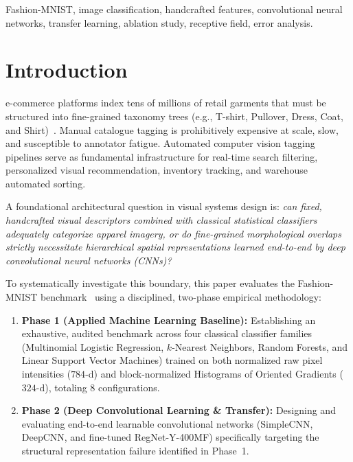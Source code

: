 \documentclass[conference]{IEEEtran}
\begin{document}
\begin{IEEEkeywords}
Fashion-MNIST, image classification, handcrafted features, convolutional neural networks, transfer learning, ablation study, receptive field, error analysis.
\end{IEEEkeywords}

\section{Introduction}\label{sec:intro}

 e-commerce platforms index tens of millions of retail garments that must be structured into fine-grained taxonomy trees (e.g., T-shirt, Pullover, Dress, Coat, and Shirt)~\cite{liu2016deepfashion}. Manual catalogue tagging is prohibitively expensive at scale, slow, and susceptible to annotator fatigue. Automated computer vision tagging pipelines serve as fundamental infrastructure for real-time search filtering, personalized visual recommendation, inventory tracking, and warehouse automated sorting.

A foundational architectural question in visual systems design is: \emph{can fixed, handcrafted visual descriptors combined with classical statistical classifiers adequately categorize apparel imagery, or do fine-grained morphological overlaps strictly necessitate hierarchical spatial representations learned end-to-end by deep convolutional neural networks (CNNs)?}

To systematically investigate this boundary, this paper evaluates the Fashion-MNIST benchmark~\cite{xiao2017fashionmnist} using a disciplined, two-phase empirical methodology:
\begin{enumerate}
    \item \textbf{Phase 1 (Applied Machine Learning Baseline):} Establishing an exhaustive, audited benchmark across four classical classifier families (Multinomial Logistic Regression, $k$-Nearest Neighbors, Random Forests, and Linear Support Vector Machines) trained on both normalized raw pixel intensities ($784$-d) and block-normalized Histograms of Oriented Gradients ($324$-d), totaling 8 configurations.
    \item \textbf{Phase 2 (Deep Convolutional Learning \& Transfer):} Designing and evaluating end-to-end learnable convolutional networks (SimpleCNN, DeepCNN, and fine-tuned RegNet-Y-400MF) specifically targeting the structural representation failure identified in Phase~1.
\end{enumerate}
\end{document}
